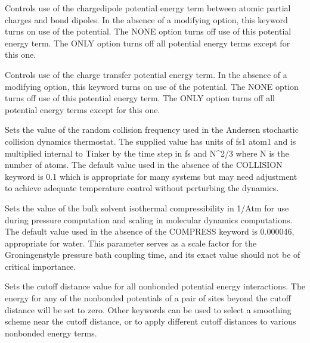\documentclass[letterpaper,11pt,english]{sphinxmanual}
\begin{document}

  Controls use of the charge\sphinxhyphen{}dipole potential energy term between atomic partial charges and bond dipoles. In the absence of a modifying option, this keyword turns on use of the potential. The NONE option turns off use of this potential energy term. The ONLY option turns off all potential energy terms except for this one.





  Controls use of the charge transfer potential energy term. In the absence of a modifying option, this keyword turns on use of the potential. The NONE option turns off use of this potential energy term. The ONLY option turns off all potential energy terms except for this one.

  Sets the value of the random collision frequency used in the Andersen stochastic collision dynamics thermostat. The supplied value has units of fs\sphinxhyphen{}1 atom\sphinxhyphen{}1 and is multiplied internal to Tinker by the time step in fs and N\textasciicircum{}2/3 where N is the number of atoms. The default value used in the absence of the COLLISION keyword is 0.1 which is appropriate for many systems but may need adjustment to achieve adequate temperature control without perturbing the dynamics.

  Sets the value of the bulk solvent isothermal compressibility in 1/Atm for use during pressure computation and scaling in molecular dynamics computations. The default value used in the absence of the COMPRESS keyword is 0.000046, appropriate for water. This parameter serves as a scale factor for the Groningen\sphinxhyphen{}style pressure bath coupling time, and its exact value should not be of critical importance.

  Sets the cutoff distance value for all nonbonded potential energy interactions. The energy for any of the nonbonded potentials of a pair of sites beyond the cutoff distance will be set to zero. Other keywords can be used to select a smoothing scheme near the cutoff distance, or to apply different cutoff distances to various nonbonded energy terms.
\end{document}
